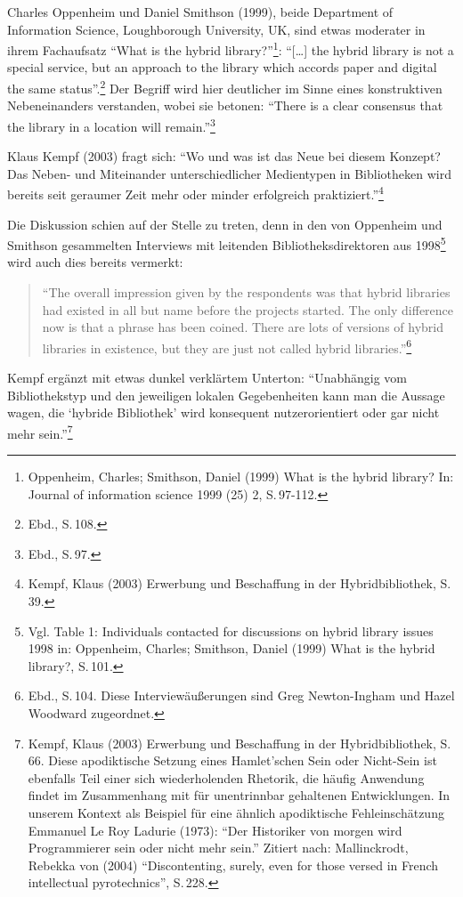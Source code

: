 \documentclass[a4paper,
fontsize=11pt,
oneside,
numbers=noperiodatend,
parskip=half-,
bibliography=totoc,
final
]{scrartcl}
\begin{document}
Charles Oppenheim und Daniel Smithson (1999), beide Department of
Information Science, Loughborough University, UK, sind etwas moderater
in ihrem Fachaufsatz \enquote{What is the hybrid library?}\footnote{Oppenheim,
  Charles; Smithson, Daniel (1999) What is the hybrid library? In:
  Journal of information science 1999 (25) 2, S.\,97-112.}:
\enquote{{[}\ldots{}{]} the hybrid library is not a special service, but
an approach to the library which accords paper and digital the same
status}.\footnote{Ebd., S.\,108.} Der Begriff wird hier deutlicher im
Sinne eines konstruktiven Nebeneinanders verstanden, wobei sie betonen:
\enquote{There is a clear consensus that the library in a location will
remain.}\footnote{Ebd., S.\,97.}

Klaus Kempf (2003) fragt sich: \enquote{Wo und was ist das Neue bei
diesem Konzept? Das Neben- und Miteinander unterschiedlicher Medientypen
in Bibliotheken wird bereits seit geraumer Zeit mehr oder minder
erfolgreich praktiziert.}\footnote{Kempf, Klaus (2003) Erwerbung und
  Beschaffung in der Hybridbibliothek, S.\,39.}

Die Diskussion schien auf der Stelle zu treten, denn in den von
Oppenheim und Smithson gesammelten Interviews mit leitenden
Bibliotheksdirektoren aus 1998\footnote{Vgl. Table 1: Individuals
  contacted for discussions on hybrid library issues 1998 in: Oppenheim,
  Charles; Smithson, Daniel (1999) What is the hybrid library?, S.\,101.}
wird auch dies bereits vermerkt:

\begin{quote}
\enquote{The overall impression given by the respondents was that hybrid
libraries had existed in all but name before the projects started. The
only difference now is that a phrase has been coined. There are lots of
versions of hybrid libraries in existence, but they are just not called
hybrid libraries.}\footnote{Ebd., S.\,104. Diese Interviewäußerungen sind
  Greg Newton-Ingham und Hazel Woodward zugeordnet.}
\end{quote}

Kempf ergänzt mit etwas dunkel verklärtem Unterton: \enquote{Unabhängig
vom Bibliothekstyp und den jeweiligen lokalen Gegebenheiten kann man die
Aussage wagen, die \enquote{hybride Bibliothek} wird konsequent
nutzerorientiert oder gar nicht mehr sein.}\footnote{Kempf, Klaus (2003)
  Erwerbung und Beschaffung in der Hybridbibliothek, S.\,66. Diese
  apodiktische Setzung eines Hamlet'schen Sein oder Nicht-Sein ist
  ebenfalls Teil einer sich wiederholenden Rhetorik, die häufig
  Anwendung findet im Zusammenhang mit für unentrinnbar gehaltenen
  Entwicklungen. In unserem Kontext als Beispiel für eine ähnlich
  apodiktische Fehleinschätzung Emmanuel Le Roy Ladurie (1973):
  \enquote{Der Historiker von morgen wird Programmierer sein oder nicht
  mehr sein.} Zitiert nach: Mallinckrodt, Rebekka von (2004)
  \enquote{Discontenting, surely, even for those versed in French
  intellectual pyrotechnics}, S.\,228.}
\end{document}
